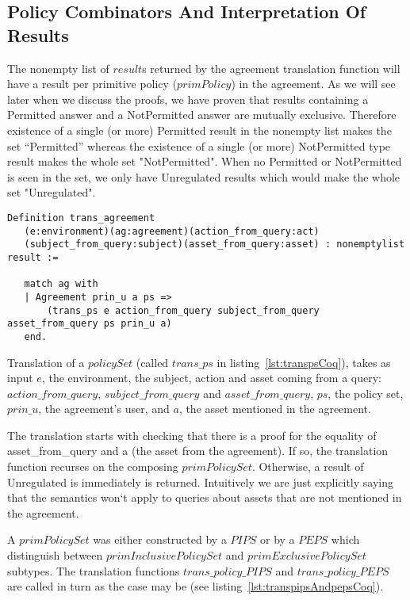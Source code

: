 \subsection{Policy Combinators And Interpretation Of Results}\label{subsec:policycombinators}

The nonempty list of $result$s returned by the agreement translation function will have a result per primitive policy ($primPolicy$) in the agreement. As we will see later when we discuss the proofs, we have proven that results containing a Permitted answer and a NotPermitted answer are mutually exclusive. Therefore existence of a single (or more) Permitted result in the nonempty list makes the set ``Permitted'' whereas the existence of a single (or more) NotPermitted type result makes the whole set "NotPermitted". When no Permitted or NotPermitted is seen in the set, we only have Unregulated results which would make the whole set "Unregulated". 

\begin{lstlisting}
Definition trans_agreement
   (e:environment)(ag:agreement)(action_from_query:act)
   (subject_from_query:subject)(asset_from_query:asset) : nonemptylist result :=

   match ag with
   | Agreement prin_u a ps => 
       (trans_ps e action_from_query subject_from_query asset_from_query ps prin_u a)
   end.
\end{lstlisting}

Translation of a $policySet$ (called $trans\_ps$ in listing~\ref{lst:transpsCoq}), takes as input $e$, the environment, the subject, action and asset coming from a query: $action\_from\_query$, $subject\_from\_query$ and $asset\_from\_query$, $ps$, the policy set, $prin\_{u}$, the agreement's user, and $a$, the asset mentioned in the agreement. 

The translation starts with checking that there is a proof for the equality of asset_from_query and a (the asset from the agreement). If so, the translation function recurses on the composing $primPolicySet$. Otherwise, a result of Unregulated is immediately is returned. Intuitively we are just explicitly saying that the semantics won`t apply to queries about assets that are not mentioned in the agreement. 

A $primPolicySet$ was either constructed by a $PIPS$ or by a $PEPS$ which distinguish between $primInclusivePolicySet$ and $primExclusivePolicySet$ subtypes. The translation functions $trans\_policy\_PIPS$ and $trans\_policy\_PEPS$ are called in turn as the case may be (see listing~\ref{lst:transpipsAndpepsCoq}).

